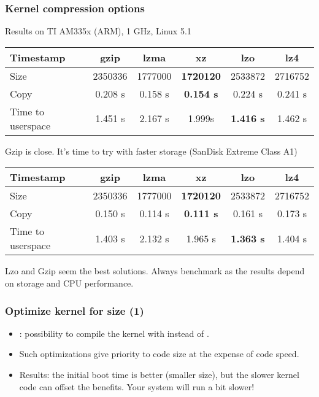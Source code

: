 \begin{frame}
\frametitle{Kernel compression options}
Results on TI AM335x (ARM), 1 GHz, Linux 5.1
{\fontsize{7}{10}\selectfont
\begin{tabular}{| l || c | c | c | c | c |}
\hline
Timestamp & gzip & lzma & xz & lzo & lz4 \\
\hline
Size & 2350336 & 1777000 & {\bf 1720120} & 2533872 & 2716752 \\
Copy & 0.208 s & 0.158 s & {\bf 0.154 s} & 0.224 s & 0.241 s \\
Time to userspace & 1.451 s & 2.167 s & 1.999s & {\bf 1.416 s} & 1.462 s \\
\hline
\end{tabular}
}
\vfill{}
Gzip is close. It's time to try with faster storage (SanDisk Extreme
Class A1)
{\fontsize{7}{10}\selectfont
\begin{tabular}{| l || c | c | c | c | c |}
\hline
Timestamp & gzip & lzma & xz & lzo & lz4 \\
\hline
Size & 2350336 & 1777000 & {\bf 1720120} & 2533872 & 2716752 \\
Copy & 0.150 s & 0.114 s & {\bf 0.111 s} & 0.161 s & 0.173 s \\
Time to userspace & 1.403 s & 2.132 s & 1.965 s & {\bf 1.363 s} & 1.404 s \\
\hline
\end{tabular}
}
\newline\newline
Lzo and Gzip seem the best solutions. Always benchmark as the results
depend on storage and CPU performance.
\end{frame}

\begin{frame}
\frametitle{Optimize kernel for size (1)}
\begin{itemize}
\item {}: possibility to compile the kernel
      with  instead of .
\item Such optimizations give priority to code size at
      the expense of code speed.
\item Results: the initial boot time is better (smaller
      size), but the slower kernel code can offset
      the benefits. Your system will run a bit slower!
\end{itemize}
\end{frame}

